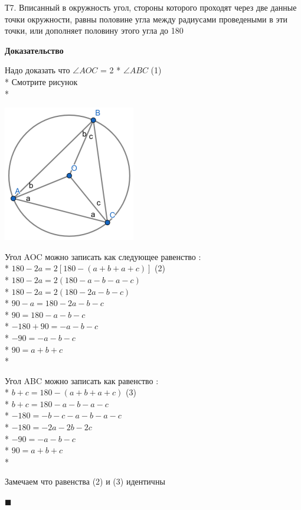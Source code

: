 \documentclass{amsart}
\begin{document}
Т7. Вписанный в окружность угол, стороны которого проходят через две данные точки окружности, равны половине угла между радиусами проведеными в эти точки, или дополняет половину этого угла до 180\degree

\textbf{Доказательство}

Надо доказать что $\angle AOC$ = 2 * $\angle ABC$   (1) \\*
Смотрите рисунок \\*

\includegraphics[scale=0.5]{vpisanii_v_okrujnosti}

Угол AOC можно записать как следующее равенство : \\*
$180-2a = 2[180-(a+b+a+c)]$  (2) \\*
$180-2a = 2(180-a-b-a-c)$ \\* 
$180-2a = 2(180-2a-b-c)$ \\*
$90-a = 180-2a-b-c$ \\*
$90 = 180-a-b-c$ \\*
$-180+90 = -a-b-c$ \\*
$-90 = -a-b-c$ \\*
$90 = a+b+c$ \\*

Угол ABC можно записать как равенство : \\*
$b+c = 180-(a+b+a+c)$ (3) \\*
$b+c = 180-a-b-a-c$ \\*
$-180 = -b-c-a-b-a-c$ \\*
$-180 = -2a-2b-2c$ \\*
$-90 = -a-b-c$ \\*
$90 = a+b+c$ \\*

Замечаем что равенства (2) и (3) идентичны

$\blacksquare$
\end{document}
